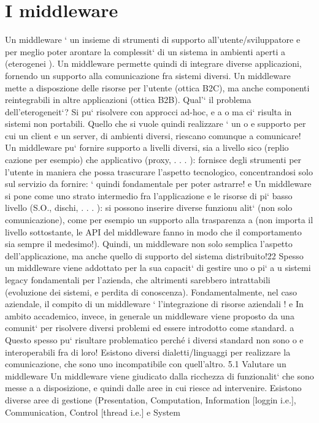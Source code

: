 \documentclass[a4paper,12pt]{article}
\begin{document}
\section{I middleware}
Un middleware ` un insieme di strumenti di supporto all'utente/sviluppatore
e
per meglio poter arontare la complessit` di un sistema in ambienti aperti
a
(eterogenei ). Un middleware permette quindi di integrare diverse applicazioni,
fornendo un supporto alla comunicazione fra sistemi diversi.
Un middleware mette a disposzione delle risorse per l'utente (ottica B2C),
ma anche componenti reintegrabili in altre applicazioni (ottica B2B).
Qual'` il problema dell'eterogeneit`? Si pu` risolvere con approcci ad-hoc,
e
a
o
ma ci` risulta in sistemi non portabili. Quello che si vuole quindi realizzare ` un
o
e
supporto per cui un client e un server, di ambienti diversi, riescano comunque
a comunicare!
Un middleware pu` fornire supporto a livelli diversi, sia a livello sico (replio
cazione per esempio) che applicativo (proxy, . . . ): fornisce degli strumenti per
l'utente in maniera che possa trascurare l'aspetto tecnologico, concentrandosi
solo sul servizio da fornire: ` quindi fondamentale per poter astrarre!
e
Un middleware si pone come uno strato intermedio fra l'applicazione e le
risorse di pi` basso livello (S.O., dischi, . . . ): si possono inserire diverse funzionu
alit` (non solo comunicazione), come per esempio un supporto alla trasparenza
a
(non importa il livello sottostante, le API del middleware fanno in modo che
il comportamento sia sempre il medesimo!). Quindi, un middleware non solo
semplica l'aspetto dell'applicazione, ma anche quello di supporto del sistema
distribuito!22
Spesso un middleware viene addottato per la sua capacit` di gestire uno o pi`
a
u
sistemi legacy fondamentali per l'azienda, che altrimenti sarebbero intrattabili
(evoluzione dei sistemi, e perdita di conoscenza). Fondamentalmente, nel caso
aziendale, il compito di un middleware ` l'integrazione di risorse aziendali !
e
In ambito accademico, invece, in generale un middleware viene proposto da
una comunit` per risolvere diversi problemi ed essere introdotto come standard.
a
Questo spesso pu` risultare problematico perché i diversi standard non sono
o
e
interoperabili fra di loro! Esistono diversi dialetti/linguaggi per realizzare la
comunicazione, che sono uno incompatibile con quell'altro.
5.1
Valutare un middleware
Un middleware viene giudicato dalla ricchezza di funzionalit` che sono messe a
a
disposizione, e quindi dalle aree in cui riesce ad intervenire. Esistono diverse
aree di gestione (Presentation, Computation, Information [loggin i.e.], Communication, Control [thread i.e.] e System
\end{document}
